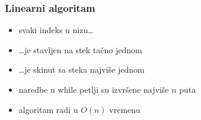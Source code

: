 \documentclass[compress]{beamer}
\begin{document}
\begin{frame}[fragile]
  \frametitle{Linearni algoritam}
  \begin{itemize}
    \item svaki indeks u nizu\ldots
    \item \ldots je stavljen na stek tačno jednom
    \item \ldots je skinut sa steka najviše jednom
    \item naredbe u while petlji su izvršene najviše $n$ puta
    \item algoritam radi u $O(n)$ vremenu
  \end{itemize}
\end{frame}
\end{document}
